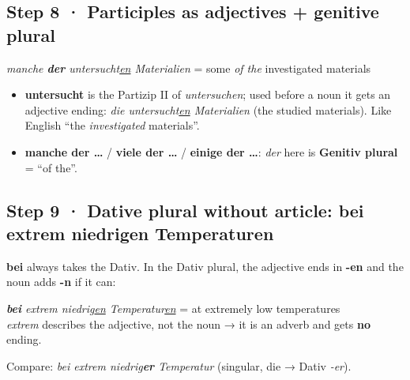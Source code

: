 \documentclass[10pt]{article}
\newcommand{\ex}[1]{\textit{#1}}
\begin{document}
\subsection*{Step 8 · Participles as adjectives + genitive plural}
\begin{tcolorbox}
\ex{manche \textbf{der} untersucht\underline{en} Materialien} = some \emph{of the} investigated materials
\end{tcolorbox}
\begin{itemize}[nosep]
\item \textbf{untersucht} is the Partizip II of \emph{untersuchen}; used before a noun it gets an adjective ending: \emph{die untersucht\underline{en} Materialien} (the studied materials). Like English “the \emph{investigated} materials”.
\item \textbf{manche der …} / \textbf{viele der …} / \textbf{einige der …}: \emph{der} here is \textbf{Genitiv plural} = “of the”.
\end{itemize}

\subsection*{Step 9 · Dative plural without article: bei extrem niedrigen Temperaturen}
\textbf{bei} always takes the Dativ. In the Dativ plural, the adjective ends in \textbf{-en} and the noun adds \textbf{-n} if it can:
\begin{tcolorbox}
\ex{\textbf{bei} extrem niedrig\underline{en} Temperatur\underline{en}} = at extremely low temperatures\\
\emph{extrem} describes the adjective, not the noun → it is an adverb and gets \textbf{no} ending.
\end{tcolorbox}
Compare: \ex{bei extrem niedrig\textbf{er} Temperatur} (singular, die → Dativ \emph{-er}).
\end{document}
